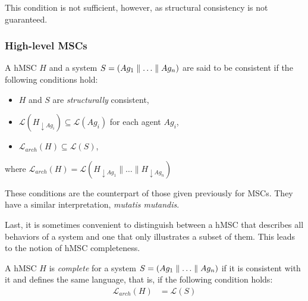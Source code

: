 This condition is not sufficient, however, as structural consistency is not guaranteed.

\subsubsection*{High-level MSCs}

A hMSC $H$ and a system $S = (Ag_1 \parallel \ldots \parallel Ag_n)$ are said to be consistent if the following conditions hold:
\begin{itemize}
\item $H$ and $S$ are \emph{structurally} consistent,
\item $\mathcal{L}(H_{\downarrow Ag_i}) \subseteq \mathcal{L}(Ag_i)$ for each agent $Ag_i$,
\item $\mathcal{L}_{arch}(H) \subseteq \mathcal{L}(S)$,
\end{itemize}
where $\mathcal{L}_{arch}(H) = \mathcal{L}(H_{\downarrow Ag_1} \parallel \ldots \parallel H_{\downarrow Ag_n})$

These conditions are the counterpart of those given previously for MSCs. They have a similar interpretation, \emph{mutatis mutandis}. 

Last, it is sometimes convenient to distinguish between a hMSC that describes all behaviors of a system and one that only illustrates a subset of them. This leads to the notion of hMSC completeness. 

A hMSC $H$ is \emph{complete} for a system $S = (Ag_1 \parallel \ldots \parallel Ag_n)$ if it is consistent with it and defines the same language, that is, if the following condition holds:
\begin{align}
\mathcal{L}_{arch}(H) &= \mathcal{L}(S)
\end{align}

